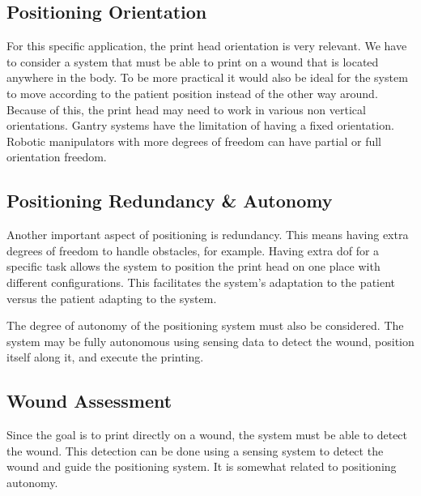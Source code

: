 
\subsection{Positioning Orientation}
\label{subsec:system_architecture_requirements_positioning_orientation}

For this specific application, the print head orientation is very relevant. We have to consider a system that must be able to print on a wound that is located anywhere in the body. To be more practical it would also be ideal for the system to move according to the patient position instead of the other way around. Because of this, the print head may need to work in various non vertical orientations. Gantry systems have the limitation of having a fixed orientation. Robotic manipulators with more degrees of freedom can have partial or full orientation freedom.


\subsection{Positioning Redundancy \& Autonomy}
\label{subsec:system_architecture_requirements_positioning_redundancy_autonomy}

Another important aspect of positioning is redundancy. This means having extra degrees of freedom to handle obstacles, for example. Having extra \gls{dof} for a specific task allows the system to position the print head on one place with different configurations. This facilitates the system's adaptation to the patient versus the patient adapting to the system.

The degree of autonomy of the positioning system must also be considered. The system may be fully autonomous using sensing data to detect the wound, position itself along it, and execute the printing.


\subsection{Wound Assessment}
\label{subsec:system_architecture_requirements_wound_assessment}

Since the goal is to print directly on a wound, the system must be able to detect the wound. This detection can be done using a sensing system to detect the wound and guide the positioning system. It is somewhat related to positioning autonomy.

